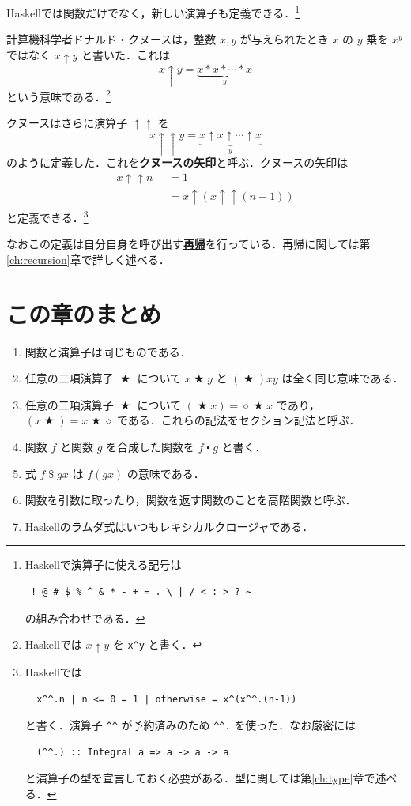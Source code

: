 \documentclass[a5paper,twoside,fleqn,draft]{jsbook}
\newcommand{\programminglanguage}[1]{\textsf{#1}}
\newcommand{\haskell}{\programminglanguage{Haskell}}
\newcommand{\keyword}[1]{{\underline{\textbf{#1}}}}
\newcommand{\code}[1]{\texttt{#1}}
\newcommand{\mKeyword}[1]{\mathsf{#1}}
\newcommand{\mOtherwiseKeyword}{\mKeyword{otherwise}}
\DeclareMathOperator{\mOtherwise}{\mOtherwiseKeyword}
\newcommand{\mAnonParam}{\diamond}
\DeclareMathOperator{\mApply}{\$}
\DeclareMathOperator{\mBinOp}{\bigstar}
\DeclareMathOperator{\mCompFunc}{\centerdot}
\newcommand{\mGuard}[1]{\mathop{\mid_{#1}}}
\begin{document}
\haskell では関数だけでなく，新しい演算子も定義できる．\footnote{\haskell で演算子に使える記号は
\begin{verbatim}
 ! @ # $ % ^ & * - + = . \ | / < : > ? ~
\end{verbatim}%
の組み合わせである．}


計算機科学者ドナルド・クヌースは，整数 $x,y$ が与えられたとき $x$ の $y$ 乗を $x^y$ ではなく $x\uparrow y$ と書いた．これは
\begin{equation}
  x\uparrow y
  =\underbrace{x*x*\dotsb*x}_{y}
\end{equation}
という意味である．\footnote{\haskell では $x\uparrow y$ を \code{x\textasciicircum y} と書く．}

クヌースはさらに演算子 $\uparrow\uparrow$ を
\begin{equation}
  x\uparrow\uparrow y
  =\underbrace{x\uparrow x\uparrow\dotsb\uparrow x}_{y}
\end{equation}
のように定義した．これを\keyword{クヌースの矢印}と呼ぶ．クヌースの矢印は
\begin{align}
  x\uparrow\uparrow n
  &\mGuard{n\le0}=1\\
  &\mGuard{\mOtherwise}
  =x\uparrow(x\uparrow\uparrow(n-1))
\end{align}
と定義できる．\footnote{\haskell では
\begin{verbatim}
  x^^.n | n <= 0 = 1 | otherwise = x^(x^^.(n-1))
\end{verbatim}
と書く．演算子 \code{\textasciicircum\textasciicircum} が予約済みのため \code{\textasciicircum\textasciicircum.} を使った．なお厳密には
\begin{verbatim}
  (^^.) :: Integral a => a -> a -> a
\end{verbatim}
と演算子の型を宣言しておく必要がある．型に関しては第\ref{ch:type}章で述べる．}

なおこの定義は自分自身を呼び出す\keyword{再帰}を行っている．再帰に関しては第\ref{ch:recursion}章で詳しく述べる．

\section{この章のまとめ}

\begin{enumerate}
\item 関数と演算子は同じものである．
\item 任意の二項演算子 $\mBinOp$ について $x\mBinOp y$ と $(\mBinOp)xy$ は全く同じ意味である．
\item 任意の二項演算子 $\mBinOp$ について $(\mBinOp x)=\mAnonParam\mBinOp x$ であり，$(x\mBinOp)=x\mBinOp\mAnonParam$ である．これらの記法をセクション記法と呼ぶ．
\item 関数 $f$ と関数 $g$ を合成した関数を $f\mCompFunc g$ と書く．
\item 式 $f\mApply gx$ は $f(gx)$ の意味である．
\item 関数を引数に取ったり，関数を返す関数のことを高階関数と呼ぶ．
\item \haskell のラムダ式はいつもレキシカルクロージャである．
\end{enumerate}
\end{document}

